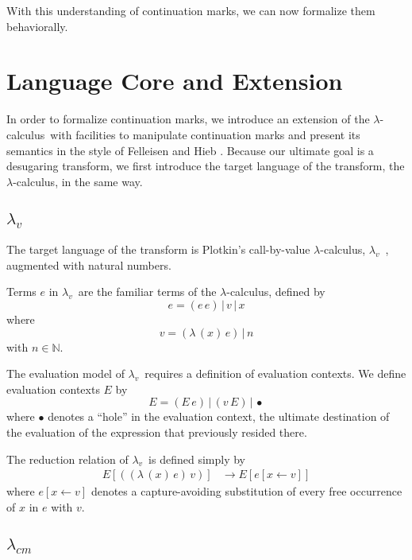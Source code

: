 \documentclass{llncs}
\newcommand{\cm}[0]{$\lambda_{cm}$}
\newcommand{\lv}[0]{$\lambda_v$}
\newcommand{\lc}[0]{$\lambda$-calculus}
\newcommand{\app}[2]{(#1\,#2)}
\newcommand{\abs}[2]{(\lambda\,(#1)\,#2)}
\newcommand{\hole}[0]{\bullet}
\newcommand{\rr}[0]{\rightarrow}
\begin{document}
With this understanding of continuation marks, we can now formalize them behaviorally.

\section{Language Core and Extension}
\label{sec-core-and-extension}

In order to formalize continuation marks, we introduce an extension of the \lc\ with facilities to manipulate continuation marks and present its semantics in the style of Felleisen and Hieb \cite{felleisen1992revised}. Because our ultimate goal is a desugaring transform, we first introduce the target language of the transform, the \lc, in the same way.

\subsection{\lv}

The target language of the transform is Plotkin's call-by-value \lc, \lv\ \cite{plotkin1975call}, augmented with natural numbers.

Terms $e$ in \lv\ are the familiar terms of the \lc, defined by
\begin{equation}
e=\app{e}{e}\,|\,v\,|\,x
\end{equation}
where 
\begin{equation}
v=\abs{x}{e}\,|\,n
\end{equation}
with $n\in\mathbb{N}$.

The evaluation model of \lv\ requires a definition of evaluation contexts. We define evaluation contexts $E$ by
\begin{equation}
E=\app{E}{e}\,|\,\app{v}{E}\,|\,\hole
\end{equation}
where $\hole$ denotes a ``hole'' in the evaluation context, the ultimate destination of the evaluation of the expression that previously resided there.

The reduction relation of \lv\ is defined simply by
\begin{align}
E[\app{\abs{x}{e}}{v}]  &\rr E[e[x\leftarrow v]]
\end{align}
where $e[x\leftarrow v]$ denotes a capture-avoiding substitution of every free occurrence of $x$ in $e$ with $v$.

\subsection{\cm}
\end{document}
